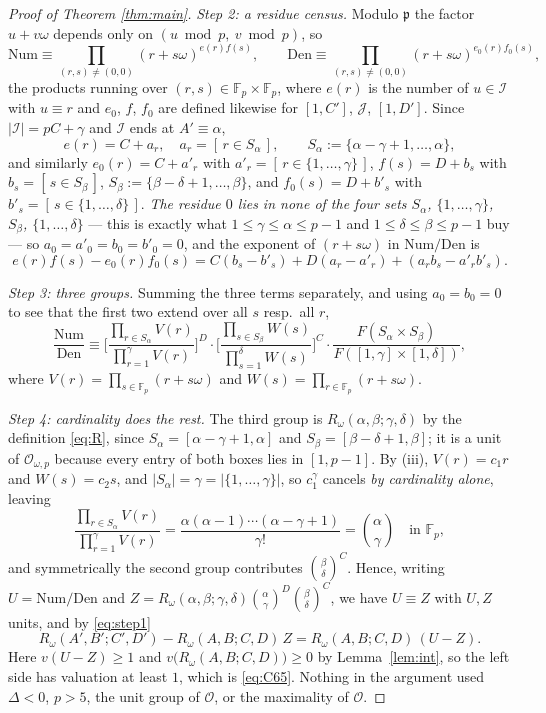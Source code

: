 \documentclass[11pt]{amsart}
\theoremstyle{remark}
\newcommand{\OO}{\mathcal{O}}
\newcommand{\Rw}{R_{\omega}}
\newcommand{\Fp}{\mathbb{F}_p}
\begin{document}
\begin{proof}[Proof of Theorem \ref{thm:main}]
\smallskip
\noindent\emph{Step 2: a residue census.}
Modulo $\mathfrak p$ the factor $u+v\omega$ depends only on
$(u\bmod p,\ v\bmod p)$, so
\[
 \mathrm{Num}\equiv\prod_{(r,s)\ne(0,0)}(r+s\omega)^{e(r)f(s)},
 \qquad
 \mathrm{Den}\equiv\prod_{(r,s)\ne(0,0)}(r+s\omega)^{e_{0}(r)f_{0}(s)},
\]
the products running over $(r,s)\in\Fp\times\Fp$, where $e(r)$ is the
number of $u\in\mathcal I$ with $u\equiv r$ and $e_{0}$, $f$, $f_{0}$ are
defined likewise for $[1,C']$, $\mathcal J$, $[1,D']$. Since
$|\mathcal I|=pC+\gamma$ and $\mathcal I$ ends at $A'\equiv\alpha$,
\[
 e(r)=C+a_{r},\quad a_{r}=[\,r\in S_{\alpha}\,],\qquad
 S_{\alpha}:=\{\alpha-\gamma+1,\dots,\alpha\},
\]
and similarly $e_{0}(r)=C+a'_{r}$ with $a'_{r}=[\,r\in\{1,\dots,\gamma\}\,]$,
$f(s)=D+b_{s}$ with $b_{s}=[\,s\in S_{\beta}\,]$,
$S_{\beta}:=\{\beta-\delta+1,\dots,\beta\}$, and $f_{0}(s)=D+b'_{s}$ with
$b'_{s}=[\,s\in\{1,\dots,\delta\}\,]$. \emph{The residue $0$ lies in none
of the four sets $S_{\alpha}$, $\{1,\dots,\gamma\}$, $S_{\beta}$,
$\{1,\dots,\delta\}$} --- this is exactly what
$1\le\gamma\le\alpha\le p-1$ and $1\le\delta\le\beta\le p-1$ buy --- so
$a_{0}=a'_{0}=b_{0}=b'_{0}=0$, and the exponent of $(r+s\omega)$ in
$\mathrm{Num}/\mathrm{Den}$ is
\[
 e(r)f(s)-e_{0}(r)f_{0}(s)
 =C(b_{s}-b'_{s})+D(a_{r}-a'_{r})+(a_{r}b_{s}-a'_{r}b'_{s}).
\]

\smallskip
\noindent\emph{Step 3: three groups.}
Summing the three terms separately, and using $a_{0}=b_{0}=0$ to see that
the first two extend over all $s$ resp.\ all $r$,
\[
 \frac{\mathrm{Num}}{\mathrm{Den}}
 \equiv
 \Biggl[\frac{\prod_{r\in S_{\alpha}}V(r)}{\prod_{r=1}^{\gamma}V(r)}\Biggr]^{D}
 \cdot
 \Biggl[\frac{\prod_{s\in S_{\beta}}W(s)}{\prod_{s=1}^{\delta}W(s)}\Biggr]^{C}
 \cdot
 \frac{F(S_{\alpha}\times S_{\beta})}{F([1,\gamma]\times[1,\delta])},
\]
where $V(r)=\prod_{s\in\Fp}(r+s\omega)$ and
$W(s)=\prod_{r\in\Fp}(r+s\omega)$.

\smallskip
\noindent\emph{Step 4: cardinality does the rest.}
The third group is $\Rw(\alpha,\beta;\gamma,\delta)$ by the definition
\eqref{eq:R}, since $S_{\alpha}=[\alpha-\gamma+1,\alpha]$ and
$S_{\beta}=[\beta-\delta+1,\beta]$; it is a unit of $\OO_{\omega,p}$
because every entry of both boxes lies in $[1,p-1]$. By (iii),
$V(r)=c_{1}r$ and $W(s)=c_{2}s$, and $|S_{\alpha}|=\gamma=|\{1,\dots,\gamma\}|$,
so $c_{1}^{\gamma}$ cancels \emph{by cardinality alone}, leaving
\[
 \frac{\prod_{r\in S_{\alpha}}V(r)}{\prod_{r=1}^{\gamma}V(r)}
 =\frac{\alpha(\alpha-1)\cdots(\alpha-\gamma+1)}{\gamma!}
 =\binom{\alpha}{\gamma}
 \quad\text{in }\Fp,
\]
and symmetrically the second group contributes $\binom{\beta}{\delta}^{C}$.
Hence, writing $U=\mathrm{Num}/\mathrm{Den}$ and
$Z=\Rw(\alpha,\beta;\gamma,\delta)\binom{\alpha}{\gamma}^{D}
\binom{\beta}{\delta}^{C}$, we have $U\equiv Z$ with $U,Z$ units, and by
\eqref{eq:step1}
\[
 \Rw(A',B';C',D')-\Rw(A,B;C,D)\,Z
 =\Rw(A,B;C,D)\,(U-Z).
\]
Here $v(U-Z)\ge1$ and $v\bigl(\Rw(A,B;C,D)\bigr)\ge0$ by
Lemma~\ref{lem:int}, so the left side has valuation at least $1$, which is
\eqref{eq:C65}. Nothing in the argument used $\Delta<0$, $p>5$, the unit
group of $\OO$, or the maximality of $\OO$.
\end{proof}
\end{document}
